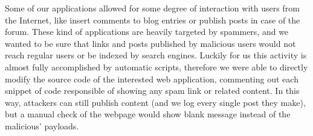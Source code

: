  Some of our applications allowed for some degree of interaction with users from the Internet, like insert comments to blog entries or publish posts in case of the forum. These kind of applications are heavily targeted by spammers, and we wanted to be sure that links and posts published by malicious users would not reach regular users or be indexed by search engines. Luckily for us this activity is almost fully accomplished by automatic scripts, therefore we were able to directly modify the source code of the interested web application, commenting out each snippet of code responsible of showing any spam link or related content. In this way, attackers can still publish content (and we log every single post they make), but a manual check of the webpage would show blank message instead of the malicious' payloads.
